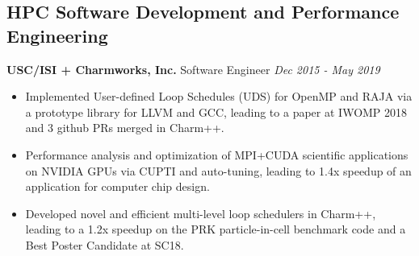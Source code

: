 \subsection*{HPC Software Development and Performance Engineering}
\newcommand{\myExpFour}{
\item Implemented User-defined Loop Schedules (UDS) for OpenMP and RAJA via a prototype library for LLVM and GCC, leading to a paper at IWOMP 2018 and 3 github PRs merged in Charm++. 
\item Performance analysis and optimization of MPI+CUDA scientific applications on NVIDIA GPUs via CUPTI and auto-tuning, leading to 1.4x speedup of an application for computer chip design.
\item Developed novel and efficient multi-level loop schedulers in Charm++, leading to a 1.2x speedup on the PRK particle-in-cell benchmark code and a Best Poster Candidate at SC18.
} 
\noindent
\textbf{USC/ISI + Charmworks, Inc.}\hfill
{Software Engineer} \hfill \textit{Dec 2015 - May 2019}
\vspace{-0.0in}
\begin{itemize}[itemsep=-0.1em]
\myExpFour
\end{itemize}

